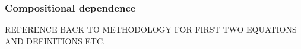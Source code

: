 %
%
%
%
%
%
%
 
\subsubsection{Compositional dependence}

REFERENCE BACK TO METHODOLOGY FOR FIRST TWO EQUATIONS AND DEFINITIONS ETC.

